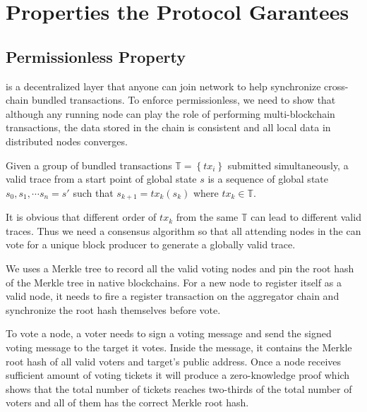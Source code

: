 \section {Properties the Protocol Garantees}
\label{chp:properities}



\subsection{Permissionless Property}
\dprotocol is a decentralized layer that anyone can join network to help synchronize cross-chain bundled transactions. To enforce permissionless, we need to show that although any running node can play the role of performing multi-blockchain transactions, the data stored in the chain is consistent and all local data in distributed nodes converges.

Given a group of bundled transactions $\mathbb{T} = \left\{tx_i\right\}$ submitted simultaneously, a valid trace from a start point of global state $s$ is a sequence of global state $s_0, s_1, \cdots s_n = s'$ such that $s_{k+1} = tx_k(s_k)$ where $tx_k \in \mathbb{T}$.

It is obvious that different order of $tx_k$ from the same $\mathbb{T}$ can lead to different valid traces. Thus we need a consensus algorithm so that all attending nodes in the \dprotocol can vote for a unique block producer to generate a globally valid trace.

We uses a Merkle tree to record all the valid voting nodes and pin the root hash of the Merkle tree in native blockchains. For a new node to register itself as a valid node, it needs to fire a register transaction on the aggregator chain and synchronize the root hash themselves before vote.

To vote a node, a voter needs to sign a voting message and send the signed voting message to the target it votes. Inside the message, it contains the Merkle root hash of all valid voters and target's public address. Once a node receives sufficient amount of voting tickets it will produce a zero-knowledge proof which shows that the total number of tickets reaches two-thirds of the total number of voters and all of them has the correct Merkle root hash. 

